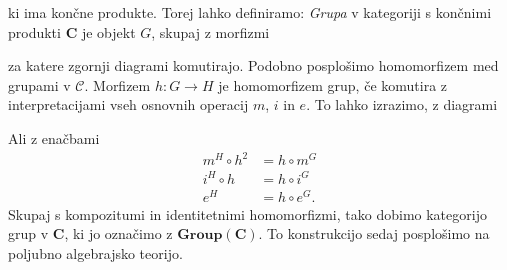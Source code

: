 \documentclass[../kategoricna_logika.tex]{subfiles}
\begin{document}
ki ima končne produkte. Torej lahko definiramo:
\emph{Grupa} v kategoriji s končnimi produkti $\mathbf{C}$ je objekt
$G$, skupaj z morfizmi
\begin{center}
\end{center}
za katere zgornji diagrami komutirajo.
%
Podobno posplošimo homomorfizem med grupami v $\mathcal{C}$. Morfizem
$h : G \to H$ je homomorfizem grup, če komutira z interpretacijami
vseh osnovnih operacij $m$, $i$ in $e$.
To lahko izrazimo, z diagrami
%
\begin{center}
\end{center}
Ali z enačbami
\begin{align*}
m^H \circ h^2 &= h \circ m^G \\
i^H \circ h &= h \circ i^G \\
e^H &= h \circ e^G.
\end{align*}
Skupaj s kompozitumi in identitetnimi homomorfizmi, tako dobimo
kategorijo grup v $\mathbf{C}$, ki jo označimo z $\mathbf{Group}(\mathbf{C})$.
To konstrukcijo sedaj posplošimo na poljubno algebrajsko teorijo.
\end{document}
